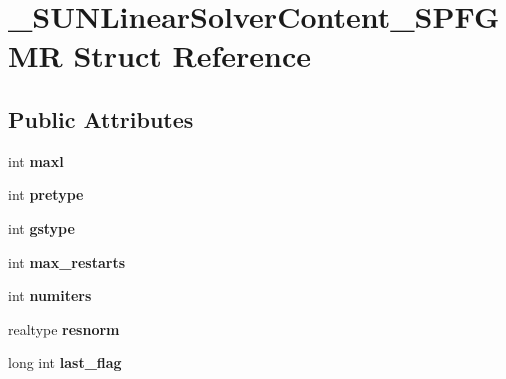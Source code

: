 \hypertarget{struct__SUNLinearSolverContent__SPFGMR}{}\section{\+\_\+\+S\+U\+N\+Linear\+Solver\+Content\+\_\+\+S\+P\+F\+G\+MR Struct Reference}
\label{struct__SUNLinearSolverContent__SPFGMR}
\subsection*{Public Attributes}
\begin{DoxyCompactItemize}
\item 
\mbox{\label{struct__SUNLinearSolverContent__SPFGMR_a81a10a114996b20cf84666b9f875b42e}} 
int {\bfseries maxl}
\item 
\mbox{\label{struct__SUNLinearSolverContent__SPFGMR_ae32922e472009a9f741ad96f45335e81}} 
int {\bfseries pretype}
\item 
\mbox{\label{struct__SUNLinearSolverContent__SPFGMR_a0b8305e65ed5485ef5fa2d946c01f017}} 
int {\bfseries gstype}
\item 
\mbox{\label{struct__SUNLinearSolverContent__SPFGMR_a1a0afaf0003bc5912ce7626eb86f7dd9}} 
int {\bfseries max\+\_\+restarts}
\item 
\mbox{\label{struct__SUNLinearSolverContent__SPFGMR_a91366a3c3564a45283aad5c2277e0b65}} 
int {\bfseries numiters}
\item 
\mbox{\label{struct__SUNLinearSolverContent__SPFGMR_af4dae98c80c217f07380e3da881d9130}} 
realtype {\bfseries resnorm}
\item 
\mbox{\label{struct__SUNLinearSolverContent__SPFGMR_ad2a1f0c7012294460d12197e4db75531}} 
long int {\bfseries last\+\_\+flag}
\item 
\mbox{\label{struct__SUNLinearSolverContent__SPFGMR_a92eb6c3550701a16ff9b77fa69bb335e}} 

\end{DoxyCompactItemize}
